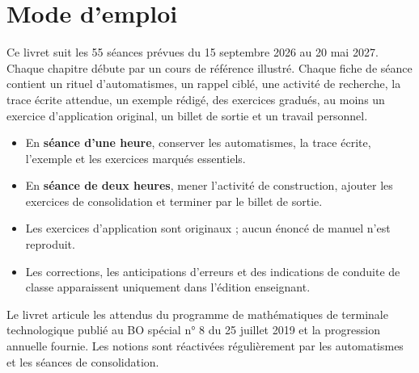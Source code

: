 \chapter*{Mode d'emploi}
Ce livret suit les 55 séances prévues du 15 septembre 2026 au 20 mai 2027. Chaque chapitre débute par un cours de référence illustré. Chaque fiche de séance contient un rituel d'automatismes, un rappel ciblé, une activité de recherche, la trace écrite attendue, un exemple rédigé, des exercices gradués, au moins un exercice d'application original, un billet de sortie et un travail personnel.

\begin{itemize}
\item En \textbf{séance d'une heure}, conserver les automatismes, la trace écrite, l'exemple et les exercices marqués essentiels.
\item En \textbf{séance de deux heures}, mener l'activité de construction, ajouter les exercices de consolidation et terminer par le billet de sortie.
\item Les exercices d'application sont originaux ; aucun énoncé de manuel n'est reproduit.
\item Les corrections, les anticipations d'erreurs et des indications de conduite de classe apparaissent uniquement dans l'édition enseignant.
\end{itemize}

\begin{keypoint}
Le livret articule les attendus du programme de mathématiques de terminale technologique publié au BO spécial n° 8 du 25 juillet 2019 et la progression annuelle fournie. Les notions sont réactivées régulièrement par les automatismes et les séances de consolidation.
\end{keypoint}

\tableofcontents
